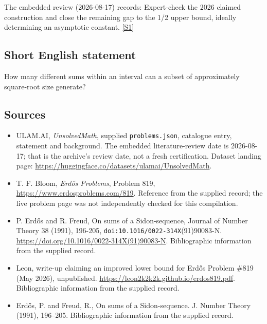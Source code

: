\documentclass[11pt,a4paper]{article}
\newcommand{\sref}[2]{\hyperlink{source:#1:#2}{[S#2]}}
\begin{document}
The embedded review (2026-08-17) records: Expert-check the 2026 claimed construction and close the remaining gap to the 1/2 upper bound, ideally determining an asymptotic constant. \sref{statement}{1}

\subsection{Short English statement}

How many different sums within an interval can a subset of approximately square-root size generate?

\subsection{Sources}

{\small

\begin{itemize}

\item[\hypertarget{source:statement:1}{S1}] ULAM.AI, \emph{UnsolvedMath}, supplied \texttt{problems.json}, catalogue entry, statement and background. The embedded literature-review date is 2026-08-17; that is the archive’s review date, not a fresh certification. Dataset landing page: \url{https://huggingface.co/datasets/ulamai/UnsolvedMath}.

\item[\hypertarget{source:statement:2}{S2}] T. F. Bloom, \emph{Erdős Problems}, Problem 819, \url{https://www.erdosproblems.com/819}. Reference from the supplied record; the live problem page was not independently checked for this compilation.

\item[\hypertarget{source:statement:3}{S3}] P. Erdős and R. Freud, On sums of a Sidon-sequence, Journal of Number Theory 38 (1991), 196-205, \nolinkurl{doi:10.1016/0022-314X}(91)90083-N. \url{https://doi.org/10.1016/0022-314X(91)90083-N}. Bibliographic information from the supplied record.

\item[\hypertarget{source:statement:4}{S4}] Leon, write-up claiming an improved lower bound for Erdős Problem \#819 (May 2026), unpublished. \url{https://leon2k2k2k.github.io/erdos819.pdf}. Bibliographic information from the supplied record.

\item[\hypertarget{source:statement:5}{S5}] Erd\H{o}s, P. and Freud, R., On sums of a {S}idon-sequence. J. Number Theory (1991), 196--205. Bibliographic information from the supplied record.

\end{itemize}

}

\label{end:statement}
\end{document}
